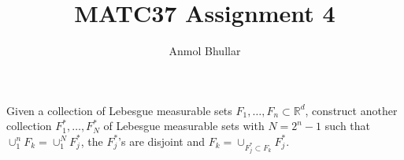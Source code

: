 \documentclass[12pt]{article}
\newcommand{\R}{\mathbb{R}}
\newenvironment{problem}[2][Problem]{\begin{trivlist}
\item[\hskip \labelsep {\bfseries #1}\hskip \labelsep {\bfseries #2.}]}{\end{trivlist}}
\begin{document}
 
 
\title{MATC37 Assignment 4}
\author{Anmol Bhullar}
 
\maketitle


\begin{problem}{1}
    Given a collection of Lebesgue measurable sets $F_1,\hdots,F_n\subset\R^d$, construct another collection
    $F_1^*,\hdots,F_N^*$ of Lebesgue measurable sets with $N = 2^n - 1$ such that $\cup_1^n F_k = \cup_1^N F_j^*$, the
    $F_j^*$'s are disjoint and $F_k = \cup_{F_j^*\subset F_k} F_j^*$.
\end{problem}
\end{document}
